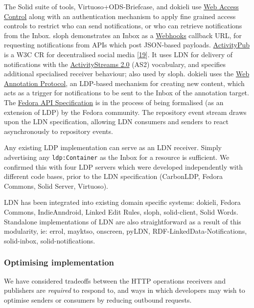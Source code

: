 \documentclass[]{article}
\begin{document}
The Solid suite of tools, Virtuoso+ODS-Briefcase, and dokieli use
\href{https://www.w3.org/wiki/WebAccessControl}{Web Access Control}
along with an authentication mechanism to apply fine grained access
controls to restrict who can send notifications, or who can retrieve
notifications from the Inbox. sloph demonstrates an Inbox as a
\href{http://www.webhooks.org/}{Webhooks} callback URL, for requesting
notifications from APIs which post JSON-based payloads.
\href{https://www.w3.org/TR/activitypub/}{ActivityPub} is a W3C CR for
decentralised social media {[}\protect\hyperlink{ref-19}{19}{]}. It uses
LDN for delivery of notifications with the
\href{https://www.w3.org/ns/activitystreams-vocabulary}{ActivityStreams
2.0} (AS2) vocabulary, and specifies additional specialised receiver
behaviour; also used by sloph. dokieli uses the
\href{https://www.w3.org/TR/annotation-protocol/}{Web Annotation
Protocol}, an LDP-based mechanism for creating new content, which acts
as a trigger for notifications to be sent to the Inbox of the annotation
target. The \href{http://fcrepo.github.io/fcrepo-specification/}{Fedora
API Specification} is in the process of being formalised (as an
extension of LDP) by the Fedora community. The repository event stream
draws upon the LDN specification, allowing LDN consumers and senders to
react asynchronously to repository events.

Any existing LDP implementation can serve as an LDN receiver. Simply
advertising any \texttt{ldp:Container} as the Inbox for a resource is
sufficient. We confirmed this with four LDP servers which were developed
independently with different code bases, prior to the LDN specification
(CarbonLDP, Fedora Commons, Solid Server, Virtuoso).

LDN has been integrated into existing domain specific systems: dokieli,
Fedora Commons, IndieAnndroid, Linked Edit Rules, sloph, solid-client,
Solid Words. Standalone implementations of LDN are also straightforward
as a result of this modularity, ie: errol, mayktso, onscreen, pyLDN,
RDF-LinkedData-Notifications, solid-inbox, solid-notifications.

\hypertarget{optimising-implementation}{}
\subsubsection{Optimising
implementation}\label{optimising-implementation}

{We have considered tradeoffs between the HTTP operations receivers and
publishers are \emph{required} to respond to, and ways in which
developers may wish to optimise senders or consumers by reducing
outbound requests.}
\end{document}
